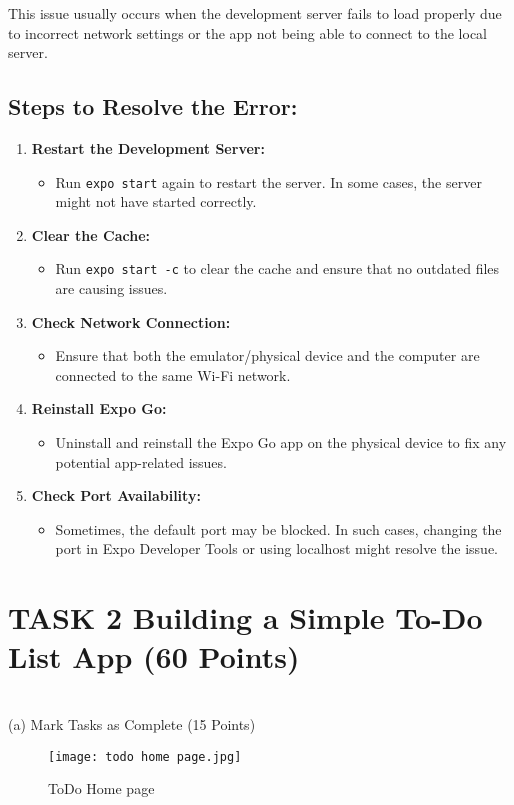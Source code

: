 \documentclass{article}
\begin{document}
This issue usually occurs when the development server fails to load properly due to incorrect network settings or the app not being able to connect to the local server.

\subsection*{Steps to Resolve the Error:}

\begin{enumerate}
    \item \textbf{Restart the Development Server:} 
    \begin{itemize}
        \item Run \texttt{expo start} again to restart the server. In some cases, the server might not have started correctly.
    \end{itemize}
    \item \textbf{Clear the Cache:} 
    \begin{itemize}
        \item Run \texttt{expo start -c} to clear the cache and ensure that no outdated files are causing issues.
    \end{itemize}
    \item \textbf{Check Network Connection:} 
    \begin{itemize}
        \item Ensure that both the emulator/physical device and the computer are connected to the same Wi-Fi network.
    \end{itemize}
    \item \textbf{Reinstall Expo Go:} 
    \begin{itemize}
        \item Uninstall and reinstall the Expo Go app on the physical device to fix any potential app-related issues.
    \end{itemize}
    \item \textbf{Check Port Availability:} 
    \begin{itemize}
        \item Sometimes, the default port may be blocked. In such cases, changing the port in Expo Developer Tools or using localhost might resolve the issue.
    \end{itemize}
\end{enumerate}


\section*{TASK 2  Building a Simple To-Do List App (60 Points)}
\\
(a) Mark Tasks as Complete (15 Points)\\
\begin{figure}[htbp]
    \centering
    \texttt{[image: todo home page.jpg]}
    \caption{ToDo Home page }
    \label{fig:enter-label}
\end{figure}\\
\end{document}

